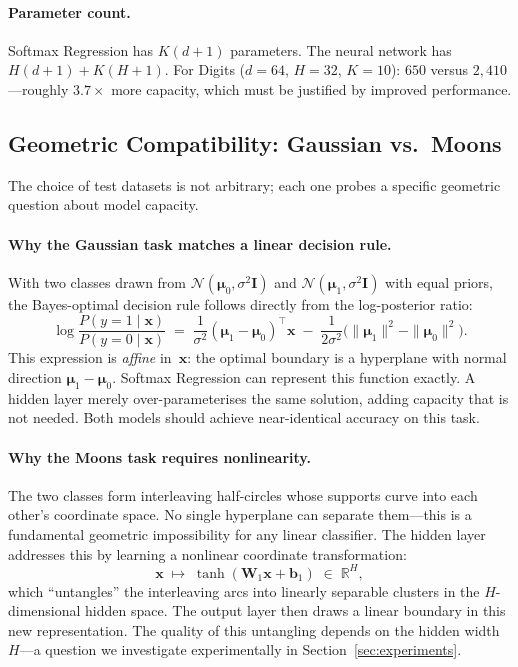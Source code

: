 \documentclass[11pt]{article}
\newcommand{\R}{\mathbb{R}}
\newcommand{\bx}{\mathbf{x}}
\newcommand{\bW}{\mathbf{W}}
\newcommand{\bb}{\mathbf{b}}
\newcommand{\bmu}{\boldsymbol{\mu}}
\begin{document}
\paragraph{Parameter count.}
Softmax Regression has $K(d + 1)$ parameters.  The neural network has $H(d+1) + K(H+1)$.  For Digits ($d{=}64$, $H{=}32$, $K{=}10$): $650$ versus $2{,}410$---roughly $3.7{\times}$ more capacity, which must be justified by improved performance.

\subsection{Geometric Compatibility: Gaussian vs.\ Moons}
\label{sec:geometry}

The choice of test datasets is not arbitrary; each one probes a specific geometric question about model capacity.

\paragraph{Why the Gaussian task matches a linear decision rule.}
With two classes drawn from $\mathcal{N}(\bmu_0,\sigma^2\mathbf{I})$ and
$\mathcal{N}(\bmu_1,\sigma^2\mathbf{I})$ with equal priors, the Bayes-optimal decision rule follows directly from the log-posterior ratio:
\begin{equation}\label{eq:logodds}
  \log\frac{P(y{=}1\mid\bx)}{P(y{=}0\mid\bx)}
  \;=\;
  \frac{1}{\sigma^2}(\bmu_1-\bmu_0)^\top\bx
  \;-\;\frac{1}{2\sigma^2}\bigl(\|\bmu_1\|^2-\|\bmu_0\|^2\bigr).
\end{equation}
This expression is \emph{affine} in~$\bx$: the optimal boundary is a hyperplane with normal direction $\bmu_1-\bmu_0$.  Softmax Regression can represent this function exactly.  A hidden layer merely over-parameterises the same solution, adding capacity that is not needed. Both models should achieve near-identical accuracy on this task.

\paragraph{Why the Moons task requires nonlinearity.}
The two classes form interleaving half-circles whose supports curve into each other's
coordinate space.  No single hyperplane can separate them---this is a fundamental geometric impossibility for any linear classifier.  The hidden layer addresses this by learning a nonlinear coordinate transformation:
\begin{equation}
  \bx \;\mapsto\; \tanh(\bW_1\bx + \bb_1) \;\in\; \R^H,
\end{equation}
which ``untangles'' the interleaving arcs into linearly separable clusters in the $H$-dimensional hidden space.  The output layer then draws a linear boundary in this new representation.  The quality of this untangling depends on the hidden width~$H$---a question we investigate experimentally in Section~\ref{sec:experiments}.
\end{document}
